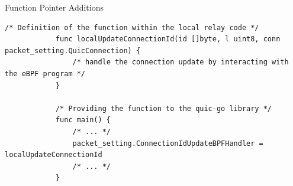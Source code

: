 \documentclass[shortpres,aspectratio=43]{beamer}
\begin{document}
\begin{frame}[fragile]{Function Pointer Additions}
    \begin{minipage}{\textwidth}
        \begin{lstlisting}[style=GoStyle, label=changes:definition-function-pointer, caption=An example of how the addition looks on the relay side.]
            /* Definition of the function within the local relay code */
            func localUpdateConnectionId(id []byte, l uint8, conn packet_setting.QuicConnection) {
                /* handle the connection update by interacting with the eBPF program */
            }   

            /* Providing the function to the quic-go library */
            func main() {
                /* ... */
                packet_setting.ConnectionIdUpdateBPFHandler = localUpdateConnectionId
                /* ... */
            }
        \end{lstlisting}
    \end{minipage}
\end{frame}
\end{document}
